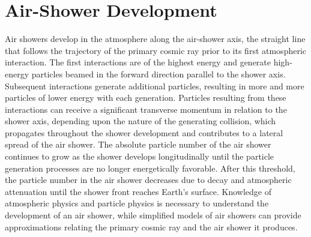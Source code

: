 




\section{Air-Shower Development}\label{sec:development}
Air showers develop in the atmosphere along the air-shower axis, the straight line that follows the trajectory of the primary cosmic ray prior to its first atmospheric interaction.
The first interactions are of the highest energy and generate high-energy particles beamed in the forward direction parallel to the shower axis.
Subsequent interactions generate additional particles, resulting in more and more particles of lower energy with each generation.
Particles resulting from these interactions can receive a significant transverse momentum in relation to the shower axis, depending upon the nature of the generating collision, which propagates throughout the shower development and contributes to a lateral spread of the air shower.
The absolute particle number of the air shower continues to grow as the shower develops longitudinally until the particle generation processes are no longer energetically favorable.
After this threshold, the particle number in the air shower decreases due to decay and atmospheric attenuation until the shower front reaches Earth's surface.
Knowledge of atmospheric physics and particle physics is necessary to understand the development of an air shower, while simplified models of air showers can provide approximations relating the primary cosmic ray and the air shower it produces.

